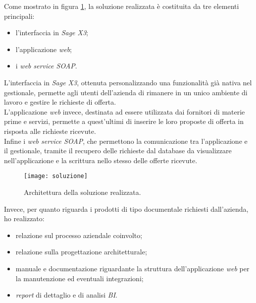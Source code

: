 Come mostrato in figura \ref{fig:architettura}, la soluzione realizzata è costituita da tre elementi principali:
\begin{itemize}
	\item l'interfaccia in \textit{Sage X3};
	\item l'applicazione \textit{web};
	\item i \textit{web service SOAP}. 
\end{itemize}
L'interfaccia in \textit{Sage X3}, ottenuta personalizzando una funzionalità già nativa nel gestionale, permette agli utenti dell'azienda di rimanere in un unico ambiente di lavoro e gestire le richieste di offerta.\\
L'applicazione \textit{web} invece, destinata ad essere utilizzata dai fornitori di materie prime e servizi, permette a quest'ultimi di inserire le loro proposte di offerta in risposta alle richieste ricevute.\\
Infine i \textit{web service SOAP}, che permettono la comunicazione tra l'applicazione e il gestionale, tramite il recupero delle richieste dal database da visualizzare nell'applicazione e la scrittura nello stesso delle offerte ricevute.

\vspace{10pt}

\begin{figure}[htbp]
	\begin{center}
		\texttt{[image: soluzione]}
		\caption{Architettura della soluzione realizzata.}
		\label{fig:architettura}
	\end{center}
\end{figure}


Invece, per quanto riguarda i prodotti di tipo documentale richiesti dall'azienda, ho realizzato:

\begin{itemize}
	\item relazione sul processo aziendale coinvolto;
	\item relazione sulla progettazione architetturale;
	\item manuale e documentazione riguardante la struttura dell'applicazione \textit{web} per la manutenzione ed eventuali integrazioni;
	\item \textit{report} di dettaglio e di analisi \textit{BI}.
\end{itemize}




